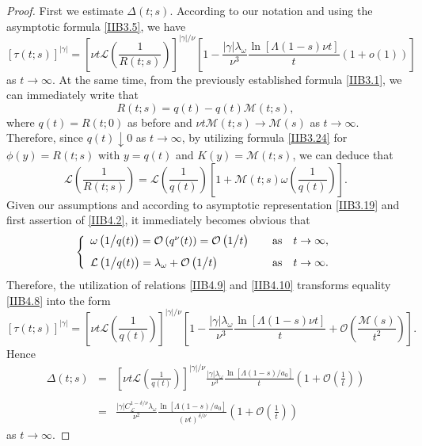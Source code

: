 \documentclass[10pt,a4paper]{amsart}
\begin{document}
\begin{proof}
    First we estimate $\Delta (t;s)$. According to our notation and
    using the asymptotic formula {\eqref{IIB3.5}}, we have
\begin{equation}                \label{IIB4.8}
    {{\left[\tau(t;s)\right]}^{|\gamma|}}={{\left[\nu{t}\mathcal{L}\left(\frac{1}{R(t;s)}\right)\right]}^{{|\gamma|}/{\nu}}}
    \left[1-\frac{|\gamma|{{\lambda}_{\omega}}}{{\nu}^{3}}\frac{\ln[\Lambda(1-s)\nu{t}]}{t}\left(1+o(1)\right)\right]
\end{equation}
    as $t\to\infty$. At the same time, from the previously established
    formula {\eqref{IIB3.1}}, we can immediately write that
\[
    R(t;s)=q(t)-q(t)\mathcal{M}(t;s),
\]
    where $q(t)=R(t;0)$ as before and $\nu{t}\mathcal{M}(t;s)\to\mathcal{M}(s)$ as $t\to\infty$. Therefore,
    since $q(t)\downarrow{0}$ as $t\to\infty$, by utilizing formula {\eqref{IIB3.24}} for $\phi(y)=R(t;s)$
    with $y=q(t)$ and $K(y)=\mathcal{M}(t;s)$, we can deduce that
\begin{equation}                \label{IIB4.9}
    \mathcal{L}\left(\frac{1}{R(t;s)}\right)=\mathcal{L}\left(\frac{1}{q(t)}\right)
    \left[1+\mathcal{M}(t;s)\omega\left(\frac{1}{q(t)}\right)\right].
\end{equation}
    Given our assumptions and according to asymptotic representation {\eqref{IIB3.19}} and
    first assertion of {\eqref{IIB4.2}}, it immediately becomes obvious that
\begin{align}                \label{IIB4.10}
\left\{
\begin{array}{l}
    \omega\left({1}\big/{q(t)}\right)=\mathcal{O}\left({q^{\nu}}(t)\right)=\mathcal{O}\left({1}\big/{t}\right)
    \qquad \hfill {\text{as}} \quad {t\to\infty,}
\vspace{2.8mm}  \\
    \mathcal{L}\left({1}\big/{q(t)}\right)={{\lambda}_{\omega}}+\mathcal{O}\left({1}\big/{t}\right)
    \qquad \hfill {\text{as}} \quad {t\to\infty.}\\
\end{array}
\right.
\end{align}
    Therefore, the utilization of relations {\eqref{IIB4.9}} and {\eqref{IIB4.10}} transforms equality {\eqref{IIB4.8}} into the form
\[
    {{\left[\tau(t;s)\right]}^{|\gamma|}}={{\left[\nu{t}\mathcal{L}\left(\frac{1}{q(t)}\right)\right]}^{{|\gamma|}/{\nu}}}
    \left[1-\frac{|\gamma|{{\lambda}_{\omega}}}{{\nu}^{3}}\frac{\ln[\Lambda(1-s)\nu{t}]}{t}+
    \mathcal{O}\left(\frac{\mathcal{M}(s)}{{t^{2}}}\right)\right].
\]
    Hence
\begin{eqnarray}              \label{IIB4.11}
    {\Delta(t;s)}
& = & {{\left[\nu{t}\mathcal{L}\left(\frac{1}{q(t)}\right)\right]}^{{|\gamma|}/{\nu}}}
    \frac{|\gamma|{{\lambda}_{\omega}}}{{\nu}^{3}}\frac{\ln\left[{\Lambda(1-s)}/{a_0}\right]}{t}
    \left(1+\mathcal{O}\left(\frac{1}{t}\right)\right) \nonumber\\
\ \nonumber\\
& = & \frac{|\gamma|C_{\mathcal{L}}^{1-{\delta}/{\nu}}{{\lambda}_{\omega}}}{{\nu}^2}
    \frac{\ln\left[{\Lambda(1-s)}/{a_0}\right]}{{(\nu{t})}^{{\delta}/{\nu}}}\left(1+\mathcal{O}\left(\frac{1}{t}\right)\right)
\end{eqnarray}
    as $t\to\infty$.


\end{proof}
\end{document}
